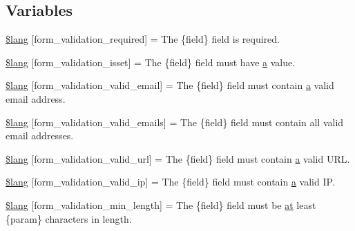\subsection*{Variables}
\begin{DoxyCompactItemize}
\item 
\mbox{\hyperlink{form__validation__lang_8php_a7c6b74d48acd188829365b6db579aa56}{\$lang}} \mbox{[}\textquotesingle{}form\+\_\+validation\+\_\+required\textquotesingle{}\mbox{]} = \textquotesingle{}The \{field\} field is required.\textquotesingle{}
\item 
\mbox{\hyperlink{form__validation__lang_8php_a6ae716d42d07e49ae48e06d0e9d9843a}{\$lang}} \mbox{[}\textquotesingle{}form\+\_\+validation\+\_\+isset\textquotesingle{}\mbox{]} = \textquotesingle{}The \{field\} field must have \mbox{\hyperlink{interfacea}{a}} value.\textquotesingle{}
\item 
\mbox{\hyperlink{form__validation__lang_8php_a20ebb5d6430eda30d97f673364274dd8}{\$lang}} \mbox{[}\textquotesingle{}form\+\_\+validation\+\_\+valid\+\_\+email\textquotesingle{}\mbox{]} = \textquotesingle{}The \{field\} field must contain \mbox{\hyperlink{interfacea}{a}} valid email address.\textquotesingle{}
\item 
\mbox{\hyperlink{form__validation__lang_8php_ae09639726ac794f66bb9fdef490cfd84}{\$lang}} \mbox{[}\textquotesingle{}form\+\_\+validation\+\_\+valid\+\_\+emails\textquotesingle{}\mbox{]} = \textquotesingle{}The \{field\} field must contain all valid email addresses.\textquotesingle{}
\item 
\mbox{\hyperlink{form__validation__lang_8php_a7b1558f69e002c2ef22c7ee3b11fdbbb}{\$lang}} \mbox{[}\textquotesingle{}form\+\_\+validation\+\_\+valid\+\_\+url\textquotesingle{}\mbox{]} = \textquotesingle{}The \{field\} field must contain \mbox{\hyperlink{interfacea}{a}} valid U\+R\+L.\textquotesingle{}
\item 
\mbox{\hyperlink{form__validation__lang_8php_a1a11ad1b087a43f55547dbf5f538ce6e}{\$lang}} \mbox{[}\textquotesingle{}form\+\_\+validation\+\_\+valid\+\_\+ip\textquotesingle{}\mbox{]} = \textquotesingle{}The \{field\} field must contain \mbox{\hyperlink{interfacea}{a}} valid I\+P.\textquotesingle{}
\item 
\mbox{\hyperlink{form__validation__lang_8php_a252fb8841eee58dd9ee9541c192ada2d}{\$lang}} \mbox{[}\textquotesingle{}form\+\_\+validation\+\_\+min\+\_\+length\textquotesingle{}\mbox{]} = \textquotesingle{}The \{field\} field must be \mbox{\hyperlink{_functions_8php_a1638aacf03530a73b0a3c373471ac79b}{at}} least \{param\} characters in length.\textquotesingle{}

\end{DoxyCompactItemize}
